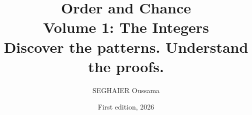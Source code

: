 \documentclass[11pt,openany]{book}
\title{\Huge\textbf{Order and Chance}\\[0.4em]\LARGE Volume 1: The Integers\\[0.6em]
\Large Discover the patterns. Understand the proofs.}
\author{SEGHAIER Oussama}
\date{First edition, 2026}
\theoremstyle{definition}
\theoremstyle{plain}
\begin{document}
\frontmatter
\makecover
\maketitle

\tableofcontents

\mainmatter
















\backmatter

\end{document}
